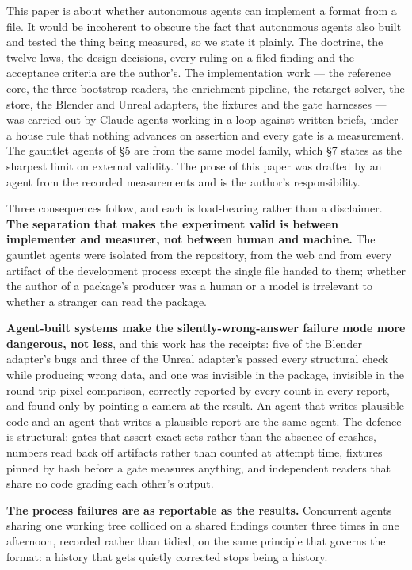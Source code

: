 \documentclass[10pt,twocolumn,letterpaper]{article}
\begin{document}
This paper is about whether autonomous agents can implement a format from a file. It would be incoherent to obscure the fact that autonomous agents also built and tested the thing being measured, so we state it plainly. The doctrine, the twelve laws, the design decisions, every ruling on a filed finding and the acceptance criteria are the author's. The implementation work --- the reference core, the three bootstrap readers, the enrichment pipeline, the retarget solver, the store, the Blender and Unreal adapters, the fixtures and the gate harnesses --- was carried out by Claude agents working in a loop against written briefs, under a house rule that nothing advances on assertion and every gate is a measurement. The gauntlet agents of \S5 are from the same model family, which \S7 states as the sharpest limit on external validity. The prose of this paper was drafted by an agent from the recorded measurements and is the author's responsibility.

Three consequences follow, and each is load-bearing rather than a disclaimer. \textbf{The separation that makes the experiment valid is between implementer and measurer, not between human and machine.} The gauntlet agents were isolated from the repository, from the web and from every artifact of the development process except the single file handed to them; whether the author of a package's producer was a human or a model is irrelevant to whether a stranger can read the package.

\textbf{Agent-built systems make the silently-wrong-answer failure mode more dangerous, not less}, and this work has the receipts: five of the Blender adapter's bugs and three of the Unreal adapter's passed every structural check while producing wrong data, and one was invisible in the package, invisible in the round-trip pixel comparison, correctly reported by every count in every report, and found only by pointing a camera at the result. An agent that writes plausible code and an agent that writes a plausible report are the same agent. The defence is structural: gates that assert exact sets rather than the absence of crashes, numbers read back off artifacts rather than counted at attempt time, fixtures pinned by hash before a gate measures anything, and independent readers that share no code grading each other's output.

\textbf{The process failures are as reportable as the results.} Concurrent agents sharing one working tree collided on a shared findings counter three times in one afternoon, recorded rather than tidied, on the same principle that governs the format: a history that gets quietly corrected stops being a history.
\end{document}
